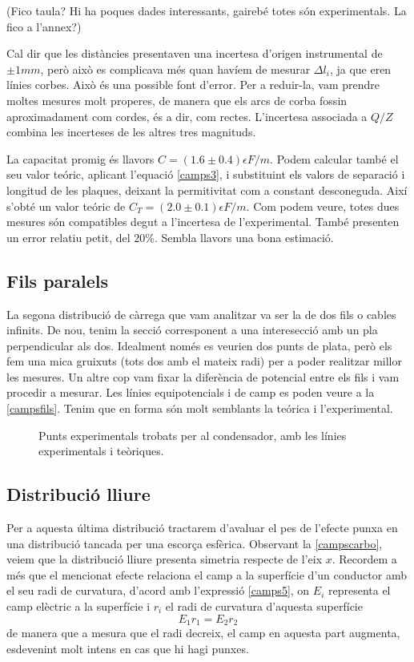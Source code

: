 (Fico taula? Hi ha poques dades interessants, gairebé totes són experimentals. La fico a l'annex?)

Cal dir que les distàncies presentaven una incertesa d'origen instrumental de $\pm 1mm$, però això es complicava més quan havíem de mesurar $\Delta l_i$, ja que eren línies corbes. Això és una possible font d'error. Per a reduir-la, vam prendre moltes mesures molt properes, de manera que els arcs de corba fossin aproximadament com cordes, és a dir, com rectes. L'incertesa associada a $Q/Z$ combina les incerteses de les altres tres magnituds.

La capacitat promig és llavors $C=(1.6\pm0.4)\epsilon F/m$. Podem calcular també el seu valor teóric, aplicant l'equació \ref{camps3}, i substituint els valors de separació i longitud de les plaques, deixant la permitivitat com a constant desconeguda.
Així s'obté un valor teóric de $C_T=(2.0\pm0.1)\epsilon F/m$. Com podem veure, totes dues mesures són compatibles degut a l'incertesa de l'experimental. També presenten un error relatiu petit, del $20\%$. Sembla llavors una bona estimació.

\subsection{Fils paralels}
La segona distribució de càrrega que vam analitzar va ser la de dos fils o cables infinits. De nou, tenim la secció corresponent a una interesecció amb un pla perpendicular als dos. Idealment només es veurien dos punts de plata, però els fem una mica gruixuts (tots dos amb el mateix radi) per a poder realitzar millor les mesures. Un altre cop vam fixar la diferència de potencial entre els fils i vam procedir a mesurar. Les línies equipotencials i de camp es poden veure a la \ref{campsfils}. Tenim que en forma són molt semblants la teórica i l'experimental.

\begin{figure}[htb]
  \centering
  \caption{ Punts experimentals trobats per al condensador, amb les línies experimentals i teòriques.}
  \label{fig:campsfils}
\end{figure}

\subsection{Distribució lliure}
Per a aquesta última distribució tractarem d'avaluar el pes de l'efecte punxa en una distribució tancada per una escorça esfèrica. Observant la \ref{campscarbo}, veiem que la distribució lliure presenta simetria respecte de l'eix $x$. Recordem a més que el mencionat efecte relaciona el camp a la superfície d'un conductor amb el seu radi de curvatura, d'acord amb l'expressió \ref{camps5}, on $E_i$ representa el camp elèctric a la superfície i $r_i$ el radi de curvatura d'aquesta superfície
\begin{equation}
E_1r_1=E_2r_2
\end{equation}
de manera que a mesura que el radi decreix, el camp en aquesta part augmenta, esdevenint molt intens en cas que hi hagi punxes.

